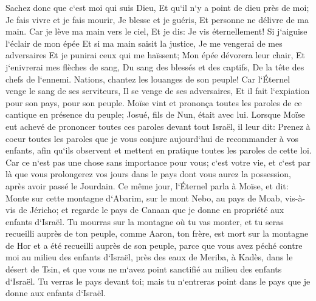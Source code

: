 \verse Sachez donc que c`est moi qui suis Dieu, Et qu`il n`y a point de dieu près de moi; Je fais vivre et je fais mourir, Je blesse et je guéris, Et personne ne délivre de ma main. 
\verse Car je lève ma main vers le ciel, Et je dis: Je vis éternellement! 
\verse Si j`aiguise l`éclair de mon épée Et si ma main saisit la justice, Je me vengerai de mes adversaires Et je punirai ceux qui me haïssent; 
\verse Mon épée dévorera leur chair, Et j`enivrerai mes flèches de sang, Du sang des blessés et des captifs, De la tête des chefs de l`ennemi. 
\verse Nations, chantez les louanges de son peuple! Car l`Éternel venge le sang de ses serviteurs, Il se venge de ses adversaires, Et il fait l`expiation pour son pays, pour son peuple. 
\verse Moïse vint et prononça toutes les paroles de ce cantique en présence du peuple; Josué, fils de Nun, était avec lui. 
\verse Lorsque Moïse eut achevé de prononcer toutes ces paroles devant tout Israël, 
\verse il leur dit: Prenez à coeur toutes les paroles que je vous conjure aujourd`hui de recommander à vos enfants, afin qu`ils observent et mettent en pratique toutes les paroles de cette loi. 
\verse Car ce n`est pas une chose sans importance pour vous; c`est votre vie, et c`est par là que vous prolongerez vos jours dans le pays dont vous aurez la possession, après avoir passé le Jourdain. 
\verse Ce même jour, l`Éternel parla à Moïse, et dit: 
\verse Monte sur cette montagne d`Abarim, sur le mont Nebo, au pays de Moab, vis-à-vis de Jéricho; et regarde le pays de Canaan que je donne en propriété aux enfants d`Israël. 
\verse Tu mourras sur la montagne où tu vas monter, et tu seras recueilli auprès de ton peuple, comme Aaron, ton frère, est mort sur la montagne de Hor et a été recueilli auprès de son peuple, 
\verse parce que vous avez péché contre moi au milieu des enfants d`Israël, près des eaux de Meriba, à Kadès, dans le désert de Tsin, et que vous ne m`avez point sanctifié au milieu des enfants d`Israël. 
\verse Tu verras le pays devant toi; mais tu n`entreras point dans le pays que je donne aux enfants d`Israël. 

\chapter{}

